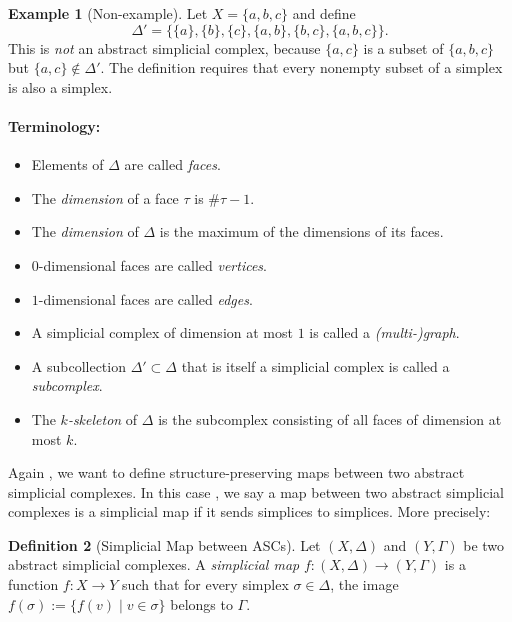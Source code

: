 \documentclass[11pt]{article}
\theoremstyle{definition}
\newtheorem{definition}{Definition}[section]
\newtheorem{example}[definition]{Example}
\theoremstyle{plain}
\begin{document}
\begin{example}[Non-example]
    Let $X = \{a, b, c\}$ and define
    \[
        \Delta' = \{ \{a\}, \{b\}, \{c\}, \{a,b\}, \{b,c\}, \{a,b,c\} \}.
    \]
    This is \emph{not} an abstract simplicial complex, because $\{a,c\}$ is a subset of $\{a,b,c\}$ but $\{a,c\} \notin \Delta'$. The definition requires that every nonempty subset of a simplex is also a simplex.
\end{example}

\paragraph{Terminology:}
\begin{itemize}
    \item Elements of $\Delta$ are called \emph{faces}.
    \item The \emph{dimension} of a face $\tau$ is $\#\tau - 1$.
    \item The \emph{dimension} of $\Delta$ is the maximum of the dimensions of its faces.
    \item $0$-dimensional faces are called \emph{vertices}.
    \item $1$-dimensional faces are called \emph{edges}.
    \item A simplicial complex of dimension at most $1$ is called a \emph{(multi-)graph}.
    \item A subcollection $\Delta' \subset \Delta$ that is itself a simplicial complex is called a \emph{subcomplex}.
    \item The \emph{$k$-skeleton} of $\Delta$ is the subcomplex consisting of all faces of dimension at most $k$.
\end{itemize}

Again , we want to define structure-preserving maps between two abstract simplicial complexes. In this case , we say a map between two abstract simplicial complexes is a simplicial map if it sends simplices to simplices.
More precisely:
\begin{definition}[Simplicial Map between ASCs]
    Let $(X, \Delta)$ and $(Y, \Gamma)$ be two abstract simplicial complexes.
    A \emph{simplicial map} $f : (X, \Delta) \to (Y, \Gamma)$ is a function $f : X \to Y$ such that for every simplex $\sigma \in \Delta$, the image $f(\sigma) := \{ f(v) \mid v \in \sigma \}$ belongs to $\Gamma$.
\end{definition}
\end{document}
